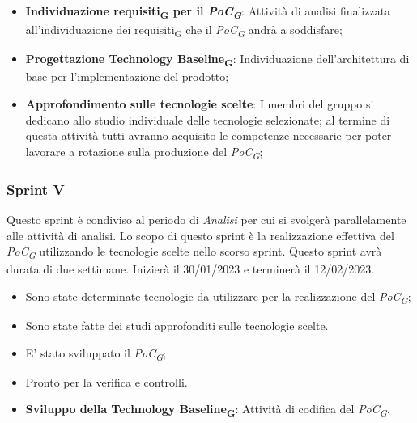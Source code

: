 \:
\begin{itemize}
	\item \textbf{Individuazione requisiti\textsubscript{G} per il \textit{PoC\textsubscript{G}}}: Attività di analisi finalizzata all’individuazione dei requisiti\textsubscript{G} che il \textit{PoC\textsubscript{G}} andrà a soddisfare;
    \item \textbf{Progettazione Technology Baseline\textsubscript{G}}: Individuazione dell’architettura di base per l’implementazione del prodotto;
    \item \textbf{Approfondimento sulle tecnologie scelte}: I membri del gruppo si dedicano allo studio individuale delle tecnologie selezionate; al termine di questa attività tutti avranno acquisito le competenze necessarie per poter lavorare a rotazione sulla produzione del \textit{PoC\textsubscript{G}};
\end{itemize}

\subsubsection{Sprint V}
Questo sprint è condiviso al periodo di \textit{Analisi} per cui si svolgerà parallelamente alle attività di analisi. 
Lo scopo di questo sprint è la realizzazione effettiva del \textit{PoC\textsubscript{G}} utilizzando le tecnologie scelte nello scorso sprint.
Questo sprint avrà durata di due settimane. Inizierà il 30/01/2023 e terminerà il 12/02/2023.

\:
\begin{itemize}
	\item Sono state determinate tecnologie da utilizzare per la realizzazione del \textit{PoC\textsubscript{G}};
	\item Sono state fatte dei studi approfonditi sulle tecnologie scelte.
\end{itemize}

\:
\begin{itemize}
	\item E' stato sviluppato il \textit{PoC\textsubscript{G}};
	\item Pronto per la verifica e controlli.
\end{itemize}

\:
\begin{itemize}
    \item \textbf{Sviluppo della Technology Baseline\textsubscript{G}}: Attività di codifica del \textit{PoC\textsubscript{G}}.
\end{itemize}

